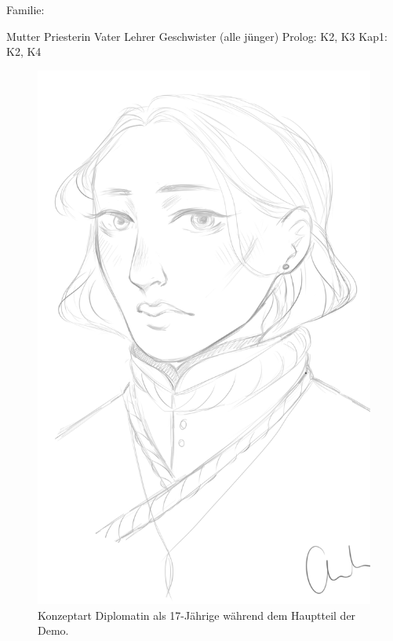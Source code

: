 Familie:
\begin{outline}
	\1 Mutter Priesterin
	\1 Vater Lehrer
		 Geschwister (alle jünger)
		\2 Prolog: K2, K3
		\2 Kap1: K2, K4
\end{outline}

\begin{figure}[tbh]
	\centering
	\includegraphics[width=0.325\textheight]{Abbildungen/Abenteuer/Hauptcharaktere/magierin}
	\caption[Konzeptart Diplomatin]{Konzeptart Diplomatin als 17-Jährige während dem Hauptteil der Demo.}
	\label{fig:mc-diplomatin}
\end{figure}





